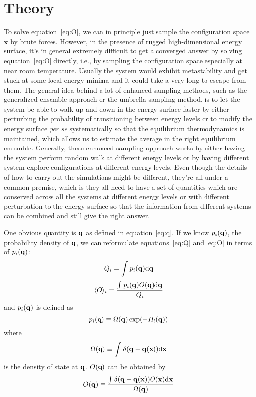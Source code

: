 \section{Theory} 
To solve equation~\ref{eq:O}, we can in principle just sample the 
configuration space $\mathbf{x}$ by brute forces. However, in the 
presence of rugged high-dimensional energy surface, it's in general
extremely difficult to get a converged answer by solving equation~\ref{eq:O} directly, 
i.e., by sampling the configuration space especially at near room temperature.
Usually the system would exhibit metastability and get stuck at some local
energy minima and it could take a very long to escape from them. The general
idea behind a lot of enhanced sampling methods, such as the generalized 
ensemble approach or the umbrella sampling method, is to let the system 
be able to walk up-and-down in the energy surface faster by either
perturbing the probability of transitioning between energy levels or to 
modify the energy surface \textit{per se} systematically so that the 
equilibrium thermodynamics is maintained, which allows us to estimate
the average in the  right equilibrium ensemble. Generally, these enhanced 
sampling approach works by either having the system perform random walk 
at different energy levels or by having different system explore configurations
at different energy levels. Even though the details of how to carry out 
the simulations might be different, they're all under a common premise, 
which is they all need to have a set of quantities which are conserved 
across all the systems at different energy levels or with different 
perturbation to the energy surface so that the information from different 
systems can be combined and still give the right answer.

One obvious quantity is $\mathbf{q}$ as defined in equation~\ref{eq:q}. 
If we know $p_{i}(\mathbf{q})$, the probability density of $\mathbf{q}$, 
we can reformulate equations~\ref{eq:Q} and \ref{eq:O} in terms of 
$p_{i}(\mathbf{q})$:
\begin{equation}
Q_{i} = \int_{}^{}{p_{i}}(\mathbf{\mathbf{q}})\mathrm{d}\mathbf{\mathbf{q}}
\label{eq:Q_q}
\end{equation}
\begin{equation}
\langle O \rangle_{i} = \frac{\int_{}^{}{p_{i}(\mathbf{q})O}(\mathbf{\mathbf{q}})\mathrm{d}\mathbf{\mathbf{q}}}{Q_{i}} 
\label{eq:Oavg_q}
\end{equation}
and $p_{i}(\mathbf{q})$ is defined as
\begin{equation}
p_{i}(\mathbf{q}) \equiv \Omega(\mathbf{q}) \exp(-H_{i}(\mathbf{q})) 
\label{eq:p_q}
\end{equation}
where
\begin{equation}
\Omega(\mathbf{q}) \equiv \int_{}^{}{\delta(\mathbf{q}-\mathbf{q}(\mathbf{x}))}\mathrm{d}\mathbf{x}
\label{eq:omega}
\end{equation}
is the density of state at $\mathbf{q}$. $O(\mathbf{q})$ can be obtained by
\begin{equation}
  O(\mathbf{q}) \equiv \frac{\int_{}^{}{\delta(\mathbf{q}-\mathbf{q}(\mathbf{x}))O}(\mathbf{\mathbf{x}})\mathrm{d}\mathbf{\mathbf{x}}}{\Omega(\mathbf{q})}
\label{eq:O_q}
\end{equation}

